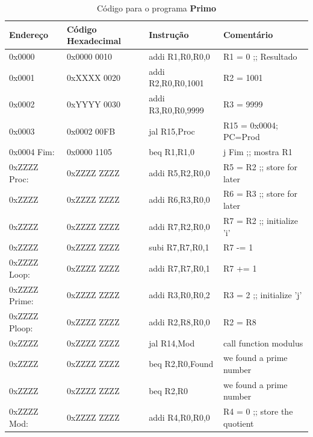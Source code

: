 \documentclass[12pt]{article}
\begin{document}
\begin{table}[H]
    \centering
    \caption{Código para o programa \textbf{Primo}}
    \begin{tabular}{|l|l|l|l|}\hline
        \textbf{Endereço} & \textbf{Código Hexadecimal} & \textbf{Instrução} & \textbf{Comentário} \\\hline
        0x0000         & 0x0000 0010 & addi R1,R0,R0,0    & R1 = 0 ;; Resultado         \\\hline
        0x0001         & 0xXXXX 0020 & addi R2,R0,R0,1001 & R2 = 1001                   \\\hline
        0x0002         & 0xYYYY 0030 & addi R3,R0,R0,9999 & R3 = 9999                   \\\hline
        0x0003         & 0x0002 00FB & jal  R15,Proc      & R15 = 0x0004; PC=Prod       \\\hline
        0x0004 Fim:    & 0x0000 1105 & beq  R1,R1,0       & j Fim ;; mostra R1          \\\hline
        0xZZZZ Proc:   & 0xZZZZ ZZZZ & addi R5,R2,R0,0    & R5 = R2 ;; store for later  \\\hline
        0xZZZZ         & 0xZZZZ ZZZZ & addi R6,R3,R0,0    & R6 = R3 ;; store for later  \\\hline
        0xZZZZ         & 0xZZZZ ZZZZ & addi R7,R2,R0,0    & R7 = R2 ;; initialize 'i'   \\\hline
        0xZZZZ         & 0xZZZZ ZZZZ & subi R7,R7,R0,1    & R7 -= 1                     \\\hline
        0xZZZZ Loop:   & 0xZZZZ ZZZZ & addi R7,R7,R0,1    & R7 += 1                     \\\hline
        0xZZZZ Prime:  & 0xZZZZ ZZZZ & addi R3,R0,R0,2    & R3 = 2 ;; initialize 'j'    \\\hline
        0xZZZZ Ploop:  & 0xZZZZ ZZZZ & addi R2,R8,R0,0    & R2 = R8                     \\\hline %
        0xZZZZ         & 0xZZZZ ZZZZ & jal  R14,Mod       & call function modulus       \\\hline
        0xZZZZ         & 0xZZZZ ZZZZ & beq  R2,R0,Found   & we found a prime number     \\\hline
        0xZZZZ         & 0xZZZZ ZZZZ & beq  R2,R0         & we found a prime number     \\\hline
        0xZZZZ Mod:    & 0xZZZZ ZZZZ & addi R4,R0,R0,0    & R4 = 0 ;; store the quotient\\\hline

\end{tabular}
\end{table}
\end{document}
